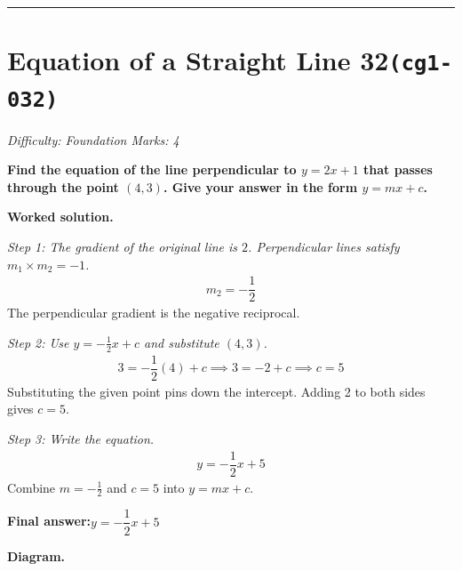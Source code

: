 \documentclass[11pt]{article}
\newcommand{\question}[1]{\par\medskip\noindent\textbf{#1}\par}
\begin{document}
\medskip\hrule

\section*{Equation of a Straight Line 32\quad\small\texttt{(cg1-032)}}
\textit{Difficulty: Foundation \quad\textbar\quad Marks: 4}

\question{Find the equation of the line perpendicular to \( y = 2x + 1 \) that passes through the point \( (4, 3) \). Give your answer in the form \( y = mx + c \).}

\textbf{Worked solution.}

\textit{Step 1: The gradient of the original line is \( 2 \). Perpendicular lines satisfy \( m_1 \times m_2 = -1 \).}
\[\begin{gathered}
m_2 = -\dfrac{1}{2}
\end{gathered}\]
The perpendicular gradient is the negative reciprocal.

\textit{Step 2: Use \( y = -\frac{1}{2}x + c \) and substitute \( (4, 3) \).}
\[\begin{gathered}
3 = -\dfrac{1}{2}(4) + c \implies 3 = -2 + c \implies c = 5
\end{gathered}\]
Substituting the given point pins down the intercept. Adding 2 to both sides gives \(c = 5\).

\textit{Step 3: Write the equation.}
\[\begin{gathered}
y = -\dfrac{1}{2}x + 5
\end{gathered}\]
Combine \(m = -\tfrac{1}{2}\) and \(c = 5\) into \(y = mx + c\).

\begin{answerbox}
\textbf{Final answer:}\quad \(\displaystyle y = -\dfrac{1}{2}x + 5\)
\end{answerbox}
\textbf{Diagram.}
\end{document}
